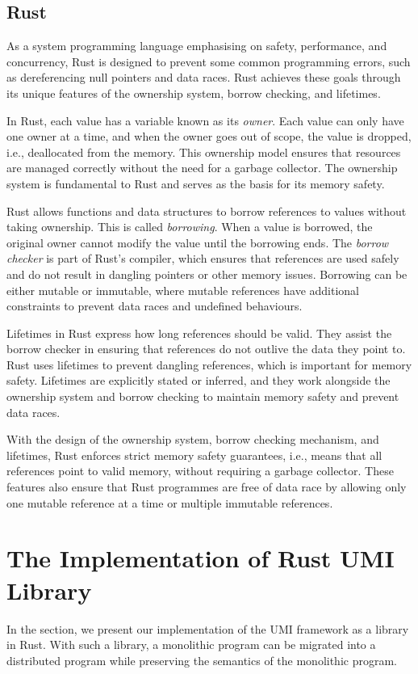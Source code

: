 \subsection{Rust}
\label{chap3:background:rust}
As a system programming language emphasising on safety, performance, and concurrency, Rust is designed to prevent some common programming errors, such as dereferencing null pointers and data races. Rust achieves these goals through its unique features of the ownership system, borrow checking, and lifetimes.

In Rust, each value has a variable known as its \emph{owner}. Each value can only have one owner at a time, and when the owner goes out of scope, the value is dropped, i.e., deallocated from the memory. This ownership model ensures that resources are managed correctly without the need for a garbage collector. The ownership system is fundamental to Rust and serves as the basis for its memory safety.

Rust allows functions and data structures to borrow references to values without taking ownership. This is called \emph{borrowing}. When a value is borrowed, the original owner cannot modify the value until the borrowing ends. The \emph{borrow checker} is part of Rust's compiler, which ensures that references are used safely and do not result in dangling pointers or other memory issues. Borrowing can be either mutable or immutable, where mutable references have additional constraints to prevent data races and undefined behaviours.

Lifetimes in Rust express how long references should be valid. They assist the borrow checker in ensuring that references do not outlive the data they point to. Rust uses lifetimes to prevent dangling references, which is important for memory safety. Lifetimes are explicitly stated or inferred, and they work alongside the ownership system and borrow checking to maintain memory safety and prevent data races.

With the design of the ownership system, borrow checking mechanism, and lifetimes, Rust enforces strict memory safety guarantees, i.e., means that all references point to valid memory, without requiring a garbage collector. These features also ensure that Rust programmes are free of data race by allowing only one mutable reference at a time or multiple immutable references.

\section{The Implementation of Rust UMI Library}
\label{chap3:implementation}
In the section, we present our implementation of the UMI framework as a library in Rust. With such a library, a monolithic program can be migrated into a distributed program while preserving the semantics of the monolithic program.

